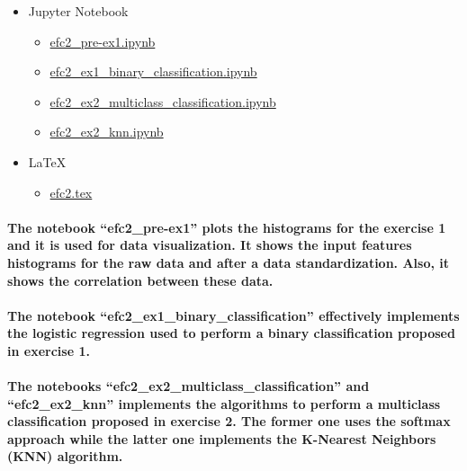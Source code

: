 \documentclass[a4paper]{article}    %
\begin{document}
\begin{itemize}
    \item Jupyter Notebook
    \begin{itemize}
        \item \href{https://github.com/ito-rafael/IA006C-MachineLearning/blob/master/efc2/efc2_pre-ex1.ipynb}{efc2\_pre-ex1.ipynb}
        \item \href{https://github.com/ito-rafael/IA006C-MachineLearning/blob/master/efc2/efc2_ex1_binary_classification.ipynb}{efc2\_ex1\_binary\_classification.ipynb}
        \item \href{https://github.com/ito-rafael/IA006C-MachineLearning/blob/master/efc2/efc2_ex2_multiclass_classification.ipynb}{efc2\_ex2\_multiclass\_classification.ipynb}
        \item \href{https://github.com/ito-rafael/IA006C-MachineLearning/blob/master/efc2/efc2_ex2_knn.ipynb}{efc2\_ex2\_knn.ipynb}
    \end{itemize}
    \item \LaTeX
    \begin{itemize}
        \item \href{https://github.com/ito-rafael/IA006C-MachineLearning/blob/master/efc2/LaTeX/efc2.tex}{efc2.tex}
    \end{itemize}
\end{itemize}

\paragraph{The notebook ``efc2\_pre-ex1'' plots the histograms for the exercise 1 and it is used for data visualization. It shows the input features histograms for the raw data and after a data standardization. Also, it shows the correlation between these data.}

\paragraph{The notebook ``efc2\_ex1\_binary\_classification'' effectively implements the logistic regression used to perform a binary classification proposed in exercise 1.}

\paragraph{The notebooks ``efc2\_ex2\_multiclass\_classification'' and ``efc2\_ex2\_knn'' implements the algorithms to perform a multiclass classification proposed in exercise 2. The former one uses the softmax approach while the latter one implements the K-Nearest Neighbors (KNN) algorithm.}
\newpage
\end{document}
